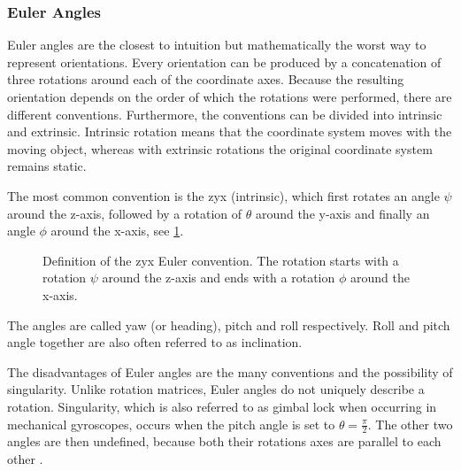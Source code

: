 \subsubsection{Euler Angles}
Euler angles are the closest to intuition but mathematically the worst way to represent orientations.
Every orientation can be produced by a concatenation of three rotations around each of the coordinate axes.
Because the resulting orientation depends on the order of which the rotations were performed, there are different conventions.
Furthermore, the conventions can be divided into intrinsic and extrinsic.
Intrinsic rotation means that the coordinate system moves with the moving object, whereas with extrinsic rotations the original coordinate system remains static.\par
The most common convention is the zyx (intrinsic), which first rotates an angle $\psi$ around the z-axis, followed by a rotation of $\theta$ around the y-axis and finally an angle $\phi$ around the x-axis, see \cref{fig:tikz_euler_angles}.
\begin{figure}[htpb]
	\centering
	
	\caption[zxy Euler convention]{Definition of the zyx Euler convention. The rotation starts with a rotation $\psi$ around the z-axis and ends with a rotation $\phi$ around the x-axis.}
	\label{fig:tikz_euler_angles}
\end{figure}

The angles are called yaw (or heading), pitch and roll respectively. Roll and pitch angle together are also often referred to as inclination.\par
The disadvantages of Euler angles are the many conventions and the possibility of singularity.
Unlike rotation matrices, Euler angles do not uniquely describe a rotation.
Singularity, which is also referred to as gimbal lock when occurring in mechanical gyroscopes, occurs when the pitch angle is set to $\theta = \frac{\pi}{2}$.
The other two angles are then undefined, because both their rotations axes are parallel to each other \cite{Kok2017}.

